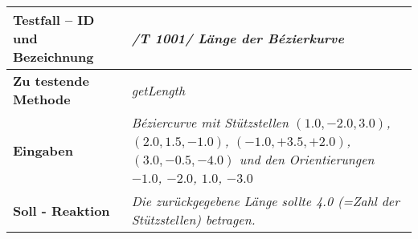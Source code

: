 \begin{longtable}{|p{7cm}|p{10cm}|}
\hline
\textbf{Testfall -- ID und Bezeichnung} & \textit{ /T 1001/ Länge der Bézierkurve} \\
\hline
\textbf{Zu testende Methode} &  \textit{getLength} \\
\hline
\textbf{Eingaben} & \textit{Béziercurve mit Stützstellen $(1.0, -2.0, 3.0)$,
$(2.0, 1.5, -1.0)$, $(-1.0, +3.5, +2.0)$, $(3.0, -0.5, -4.0)$ und
den Orientierungen $-1.0$, $-2.0$, $1.0$, $-3.0$ }\\
\hline
\textbf{Soll - Reaktion} & \textit{Die zurückgegebene Länge sollte 4.0 (=Zahl der Stützstellen)
betragen.} \\
\hline
\end{longtable}